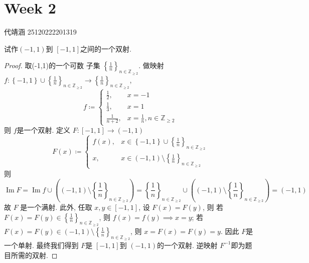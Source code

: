 \documentclass[../main.tex]{subfiles}
\begin{document}
\chapter{ Week 2 }

代靖涵 25120222201319

\begin{exercise}{}{}
    试作\(  (-1,1)  \)到 \(  \left[ -1,1 \right]   \)之间的一个双射.  
\end{exercise}
\begin{proof}
    取(-1,1)的一个可数 子集 \(  \left\{ \frac{1 }{n }  \right\}_{n\in \mathbb{Z} _{\ge 2}}  \). 做映射 \(  f: \left\{ -1,1 \right\}\cup \left\{ \frac{1 }{n }  \right\}_{n \in \mathbb{Z} _{\ge 2}}\to \left\{ \frac{1 }{n }  \right\}_{n\in \mathbb{Z} _{\ge 2}} \), \[
    f\coloneqq \begin{cases} \frac{1 }{2 },& x= -1\\
    \frac{1 }{3 },&x = 1\\ 
     \frac{1 }{n+ 2 },& x= \frac{1 }{n }    ,n \in \mathbb{Z} _{\ge 2} \end{cases} 
    \]  则 \(  f  \)是一个双射. 定义 \(  F:\left[ -1,1 \right]\to \left( -1,1 \right)    \) \[
    F\left( x \right)\coloneqq \begin{cases} f\left( x \right),& x \in \left\{ -1,1 \right\}\cup \left\{ \frac{1 }{n }  \right\}_{n \in \mathbb{Z} _{\ge 2}}\\ 
     x,& x \in \left( -1,1 \right) \setminus \left\{ \frac{1 }{n }  \right\}_{n\in \mathbb{Z} _{\ge 2}}  \end{cases}  
    \]  则 \[
    \operatorname{Im}F= \operatorname{Im}f\cup \left( \left( -1,1 \right)\setminus \left\{ \frac{1 }{n }  \right\}_{n\in  \mathbb{Z} _{\ge 2}}  \right)= \left\{ \frac{1 }{n }  \right\}_{n\in \mathbb{Z} _{\ge 2}}\cup \left( \left( -1,1 \right)\setminus \left\{ \frac{1 }{n }  \right\}_{n\in \mathbb{Z} _{\ge 2}}  \right)= \left( -1,1 \right)   
    \]故 \(  F  \) 是一个满射. 此外, 任取 \(  x,y \in \left[ -1,1 \right]   \), 设 \(  F\left( x \right)= F\left( y \right)    \), 则 若 \(  F\left( x \right)= F\left( y \right)\in \left\{ \frac{1 }{n }  \right\}_{n \in \mathbb{Z} _{\ge 2}}    \), 则  \(  f\left( x \right)= f\left( y \right)\implies x= y    \); 若 \(  F\left( x \right)= F\left( y \right)\in \left( -1,1 \right)\setminus \left\{ \frac{1 }{n }  \right\}_{ n\in \mathbb{Z} _{\ge 2}}     \), 则 \(  x= F\left( x \right)= F\left( y \right)= y    \). 因此 \(  F  \)是一个单射. 最终我们得到 \(  F  \)是 \(  \left[ -1,1 \right]   \)到 \(  (-1,1)  \)的一个双射.     逆映射 \(  F^{-1}   \)即为题目所需的双射.       
\end{proof}
\end{document}
